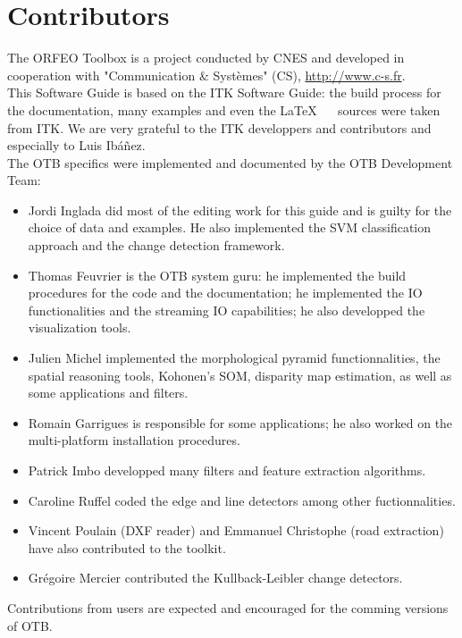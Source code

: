 \chapter*{Contributors}
\noindent

The ORFEO Toolbox is a project conducted by CNES and developed in
cooperation with "Communication \&
  Syst\`{e}mes" (CS), \url{http://www.c-s.fr}.\\

This Software Guide is based on the ITK Software Guide: the build
process for the documentation, many examples and even the \LaTeX~ ~
sources were taken from ITK. We are very grateful to the ITK
developpers and contributors and especially to Luis Ib\'a\~nez.\\

The OTB specifics were implemented and documented by the OTB Development Team:
\begin{itemize}
  \item Jordi Inglada did most of the editing work for this guide and
  is guilty for the choice of data and examples. He also implemented
  the SVM classification approach and the change detection framework.
  \item Thomas Feuvrier is the OTB system guru: he implemented the
  build procedures for the code and the documentation; he implemented
  the IO functionalities and the streaming IO capabilities; he also
  developped the visualization tools.
  \item Julien Michel implemented the morphological pyramid
  functionnalities, the spatial reasoning tools, Kohonen's SOM,
  disparity map estimation, as
  well as some applications and filters.
\item Romain Garrigues is responsible for some applications; he also
  worked on the multi-platform installation procedures.
  \item Patrick Imbo developped many filters and feature
  extraction algorithms.
  \item Caroline Ruffel coded the edge and line detectors among other
  fuctionnalities.
\item Vincent Poulain (DXF reader) and Emmanuel Christophe (road
  extraction) have also contributed to the toolkit.
\item Gr\'egoire Mercier contributed the Kullback-Leibler change detectors.

\end{itemize}

Contributions from users are expected and encouraged for the comming
versions of OTB.

